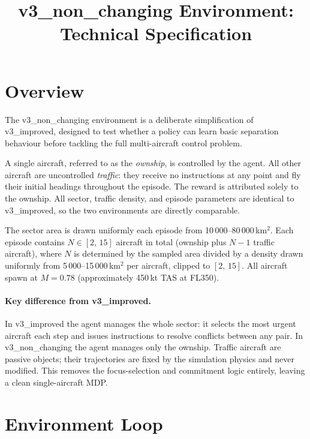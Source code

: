 \documentclass[11pt, a4paper]{article}
\title{\textbf{v3\_non\_changing Environment: Technical Specification}}
\author{}
\date{}
\begin{document}
\maketitle

\section{Overview}

The v3\_non\_changing environment is a deliberate simplification of
v3\_improved, designed to test whether a policy can learn basic separation
behaviour before tackling the full multi-aircraft control problem.

A single aircraft, referred to as the \textit{ownship}, is controlled by the
agent.
All other aircraft are uncontrolled \textit{traffic}: they receive no
instructions at any point and fly their initial headings throughout the
episode.
The reward is attributed solely to the ownship.
All sector, traffic density, and episode parameters are identical to
v3\_improved, so the two environments are directly comparable.

The sector area is drawn uniformly each episode from
10\,000--80\,000\,km$^2$.
Each episode contains $N \in [2,\,15]$ aircraft in total (ownship plus
$N-1$ traffic aircraft), where $N$ is determined by the sampled area divided
by a density drawn uniformly from 5\,000--15\,000\,km$^2$ per aircraft,
clipped to $[2,\,15]$.
All aircraft spawn at $M = 0.78$ (approximately 450\,kt TAS at FL350).

\paragraph{Key difference from v3\_improved.}
In v3\_improved the agent manages the whole sector: it selects the most
urgent aircraft each step and issues instructions to resolve conflicts between
any pair.
In v3\_non\_changing the agent manages only the ownship.
Traffic aircraft are passive objects; their trajectories are fixed by the
simulation physics and never modified.
This removes the focus-selection and commitment logic entirely, leaving a
clean single-aircraft MDP.

\section{Environment Loop}
\label{sec:loop}
\end{document}
